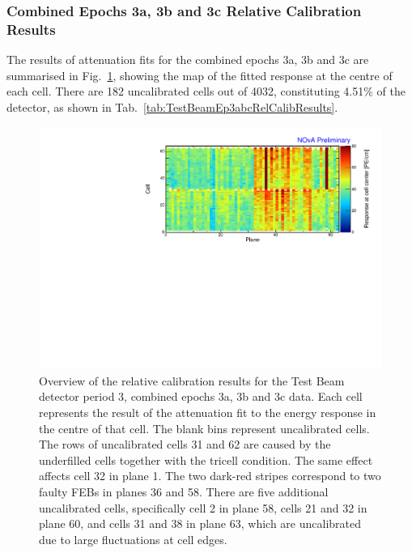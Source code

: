 \subsubsection*{Combined Epochs 3a, 3b and 3c Relative Calibration Results}

The results of attenuation fits for the combined epochs 3a, 3b and 3c are summarised in Fig.~\ref{fig:CellCentreResponseEp3abc}, showing the map of the fitted response at the centre of each cell. There are 182 uncalibrated cells out of 4032, constituting 4.51\% of the detector, as shown in Tab.~\ref{tab:TestBeamEp3abcRelCalibResults}.

\begin{figure}[!hbtp]
\centering
\includegraphics[width=\textwidth]{Plots/TBCalibration/CellResponseAtCentre_epoch3abc_Limited_NOvAPlotStyle.pdf}
\caption[Map of fitted response at cell centre for epochs 3a, 3b and 3c data]{Overview of the relative calibration results for the Test Beam detector period 3, combined epochs 3a, 3b and 3c data. Each cell represents the result of the attenuation fit to the energy response in the centre of that cell. The blank bins represent uncalibrated cells. The rows of uncalibrated cells 31 and 62 are caused by the underfilled cells together with the tricell condition. The same effect affects cell 32 in plane 1. The two dark-red stripes correspond to two faulty \glspl{FEB} in planes 36 and 58. There are five additional uncalibrated cells, specifically cell 2 in plane 58, cells 21 and 32 in plane 60, and cells 31 and 38 in plane 63, which are uncalibrated due to large fluctuations at cell edges.}
\label{fig:CellCentreResponseEp3abc}
\end{figure}

